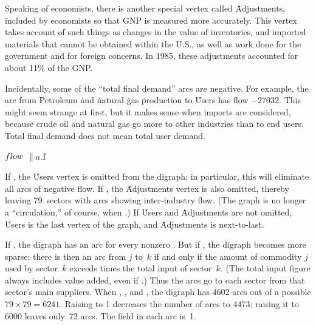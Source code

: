 Speaking of economists, there is another special vertex called
\.{Adjustments}, included by economists so that GNP is measured
more accurately. This vertex takes account of such things as changes in
the value of inventories, and imported materials that cannot be obtained
within the U.S., as well as work done for the government and for foreign
concerns. In 1985, these adjustments accounted for about 11\% of the GNP.

Incidentally, some of the ``total final demand'' arcs are negative.
For example, the arc from \.{Petroleum} \.{and} \.{natural} \.{gas}
\.{production} to \.{Users} has flow $-27032$. This might seem strange
at first, but it makes sense when imports are considered, because
crude oil and natural gas go more to other industries than to end users.
Total final demand does not mean total user demand.

\Y\B\4\D$\\{flow}$ \5
$\|a.{}$\|I\par
\fi

If , the \.{Users} vertex is omitted from the
digraph; in
particular, this will eliminate all arcs of negative flow. If
, the \.{Adjustments} vertex is also omitted, thereby
leaving
79~sectors with arcs showing inter-industry flow. (The graph is no
longer a ``circulation,'' of course, when .)  If \.{Users}
and
\.{Adjustments} are not omitted, \.{Users} is the last vertex of the
graph, and \.{Adjustments} is next-to-last.

If , the digraph has an arc for every nonzero .
But if , the digraph becomes more sparse;
there is then an arc from $j$ to~$k$ if and
only if the amount of commodity $j$ used by sector~$k$ exceeds
 times the total input of sector~$k$.  (The total
input figure always includes value added, even if .)
Thus the arcs go to each sector from
that sector's main suppliers. When , ,
and
, the digraph has 4602 arcs out of a possible
$79\times79=6241$. Raising  to 1 decreases the number of
arcs to 4473; raising it to 6000 leaves only~72 arcs.
The  field in each arc is~1.

